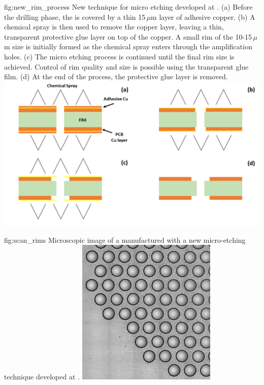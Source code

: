 \begin{dunefigure}
{fig:new_rim_process}
{New technique for  micro etching developed at . (a) Before the drilling phase, the  is covered by a thin  15\,$\mu$m layer of adhesive copper. (b) A chemical spray is then used to remove the copper layer, leaving a thin, transparent protective glue layer on top of the  copper. A small rim of the 10-15\,$\mu$m size is initially formed as the chemical spray enters through the amplification holes. (c) The micro etching process is continued until the final rim size is achieved. Control of rim quality and size is possible using the transparent glue film. (d) At the end of the process, the protective glue layer is removed.}
\includegraphics[width=1.0\textwidth]{graphics/NewRims.png}
\end{dunefigure}
\begin{dunefigure}
{fig:scan_rims}
{Microscopic image of a  manufactured with a new micro-etching technique developed at }.
\includegraphics[width=0.5\textwidth]{graphics/Scan_8.png}
\end{dunefigure}

